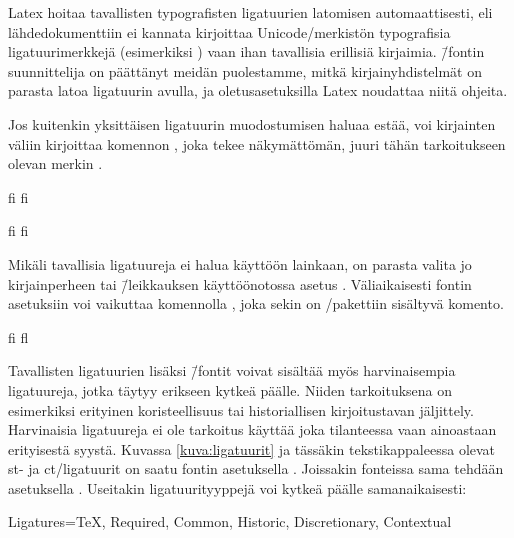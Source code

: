 Latex hoitaa tavallisten typografisten ligatuurien latomisen
automaattisesti, eli lähdedokumenttiin ei kannata kirjoittaa
Unicode\-/merkistön typografisia ligatuurimerkkejä (esimerkiksi
) vaan ihan tavallisia
erillisiä kirjaimia.  \=/fontin suunnittelija on
päättänyt meidän puolestamme, mitkä kirjainyhdistelmät on parasta latoa
ligatuurin avulla, ja oletusasetuksilla Latex noudattaa niitä ohjeita.

Jos kuitenkin yksittäisen ligatuurin muodostumisen haluaa estää, voi
kirjainten väliin kirjoittaa komennon , joka
tekee näkymättömän, juuri tähän tarkoitukseen olevan merkin
.

\begin{koodilohkosis}
fi f\textcompwordmark i
\end{koodilohkosis}

\begin{tulossis}
  fi f\textcompwordmark i
\end{tulossis}

Mikäli tavallisia ligatuureja ei halua käyttöön lainkaan, on parasta
valita jo kirjainperheen tai \=/leikkauksen käyttöönotossa asetus
. Väliaikaisesti fontin asetuksiin
voi vaikuttaa komennolla , joka sekin on
\-/pakettiin sisältyvä komento.

\begin{koodilohkosis}
{ fi fl}
\end{koodilohkosis}

Tavallisten ligatuurien lisäksi  \=/fontit voivat
sisältää myös harvinaisempia ligatuureja, jotka täytyy erikseen kytkeä
päälle. Niiden tarkoituksena on esimerkiksi erityinen koristeellisuus
tai historiallisen kirjoitustavan jäljittely. Harvinaisia ligatuureja ei
ole tarkoitus käyttää joka tilanteessa vaan ainoastaan erityisestä
syystä. Kuvassa \ref{kuva:ligatuurit} ja tässäkin tekstikappaleessa
olevat {%
  \newcommand{\hlig}[1]{{\erikoisfontti
      #1}}%
  \hlig{st}- ja \hlig{ct}\-/ligatuurit%
} on saatu fontin asetuksella .
Joissakin fonteissa sama tehdään asetuksella . Useitakin ligatuurityyppejä voi kytkeä päälle
samanaikaisesti:

\begin{koodilohkosis}
Ligatures={TeX, Required, Common, Historic, Discretionary,
  Contextual}
\end{koodilohkosis}

